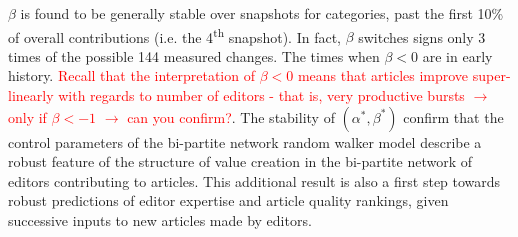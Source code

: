$\beta$ is found to be generally stable over snapshots for categories, past the first 10\% of overall contributions (i.e. the 4\textsuperscript{th} snapshot). In fact, $\beta$ switches signs only 3 times of the possible 144 measured changes. The times when $\beta < 0$ are in early history. \textcolor{red}{Recall that the interpretation of $\beta < 0$ means that articles improve super-linearly with regards to number of editors - that is, very productive bursts $\rightarrow$ only if $\beta < -1$ $\rightarrow$ can you confirm?}. The stability of $(\alpha^*,\beta^*)$ confirm that the control parameters of the bi-partite network random walker model describe a robust feature of the structure of value creation in the bi-partite network of editors contributing to articles. This additional result is also a first step towards robust predictions of editor expertise and article quality rankings, given successive inputs to new articles made by editors.


